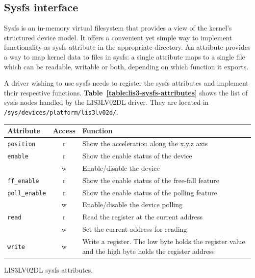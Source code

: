 \documentclass[a4paper,10pt]{article}
\makeatletter
\newenvironment{tablehere}{\def\@captype{table}}{}
\newcommand{\keyword}[1]{\texttt{#1}}
\newcommand{\reft}[1]{\textbf{Table~\ref{#1}}}
\makeatother
\begin{document}
\begin{multicols}{2}
\subsection{Sysfs interface}
\label{sec:lis3_sysfs}

Sysfs is an in-memory virtual filesystem that provides a view of the kernel's
structured device model. It offers a convenient yet simple way to implement
functionality as sysfs attribute in the appropriate directory. An attribute
provides a way to map kernel data to files in sysfs: a single attribute maps to
a single file which can be readable, writable or both, depending on which
function it exports.

A driver wishing to use sysfs needs to register the sysfs attributes and implement
their respective functions. \reft{table:lis3-sysfs-attributes} shows
the list of sysfs nodes handled by the LIS3LV02DL driver. They are located in
\keyword{/sys/devices/platform/lis3lv02d/}.\\

\begin{tablehere}
	\centering
	\renewcommand{\arraystretch}{1.2}	
	\begin{tabular}{l c p{4cm}}
		\hline
		Attribute & Access & Function \\
		\hline
		\texttt{position} & r & Show the acceleration along the x,y,z axis \\
		\hline
		\texttt{enable} & r & Show the enable status of the device \\
						& w & Enable/disable the device \\
		\hline
		\texttt{ff\_enable} & r & Show the enable status of the free-fall 
					 			  feature \\
		\hline
		\texttt{poll\_enable} & r & Show the enable status of the polling
									feature \\
							  & w & Enable/disable the device polling \\
		\hline
		\texttt{read} & r & Read the register at the current address \\
					  & w & Set the current address for reading \\
		\hline
		\texttt{write} & w & Write a register. The low byte holds the register
							 value and the high byte holds the register address \\
		\hline
	\end{tabular}
	\caption{LIS3LV02DL sysfs attributes.}
	\label{table:lis3-sysfs-attributes}
\end{tablehere}


\end{multicols}
\end{document}

